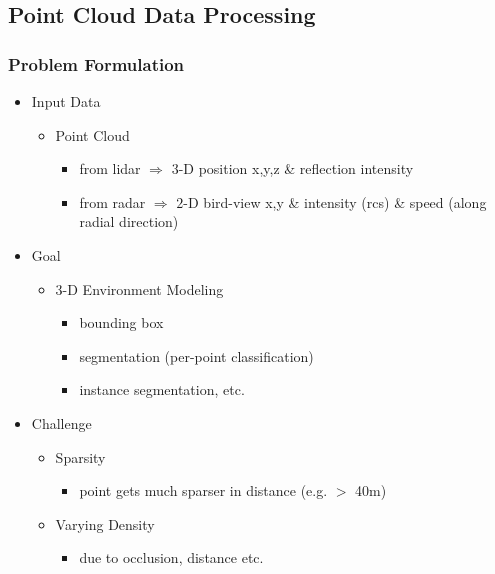 \subsection{Point Cloud Data Processing}
\subsubsection{Problem Formulation}
\begin{itemize}
\item Input Data
	\begin{itemize}
	\item Point Cloud
		\begin{itemize}
		\item from lidar $\Rightarrow$ $3$-D position x,y,z \& reflection intensity
		\item from radar $\Rightarrow$ $2$-D bird-view x,y \& intensity (rcs) \& speed (along radial direction)
		\end{itemize}
	\end{itemize}
\item Goal
	\begin{itemize}
	\item $3$-D Environment Modeling
		\begin{itemize}
		\item bounding box
		\item segmentation (per-point classification)
		\item instance segmentation, etc.
		\end{itemize}
	\end{itemize}
\item Challenge
	\begin{itemize}
	\item Sparsity
		\begin{itemize}
		\item point gets much sparser in distance (e.g. $>$ 40m)
		\end{itemize}
	\item Varying Density
		\begin{itemize}
		\item due to occlusion, distance etc.
		\end{itemize}
	\end{itemize}
\end{itemize}
